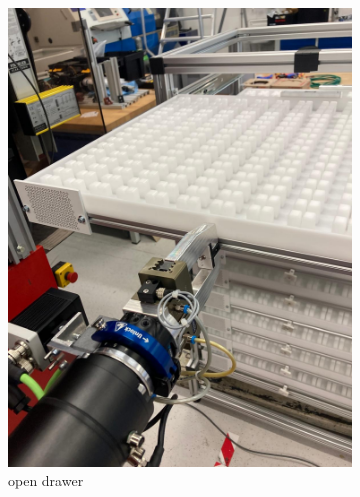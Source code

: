 \begin{figure}[!ht]
\begin{subfigure}[b]{0.32\textwidth}
        \includegraphics[width=\textwidth]{figures/shelf-control/open-drawer.jpeg}
        \caption{open drawer}
        \vspace{0.45cm}
        \label{fig:open-drawer}
    \end{subfigure}\hspace{0.1cm}
    \vspace{0.75cm}
    \begin{subfigure}[b]{0.32\textwidth}
        \centering

\end{subfigure}
\end{figure}
